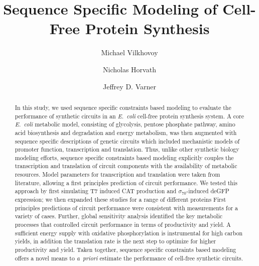 \documentclass[journal=asbcd6,manuscript=article]{achemso}
\author{Michael Vilkhovoy}
\author{Nicholas Horvath}
\author{Jeffrey D. Varner}
\affiliation[Cornell University]
{Robert Frederick Smith School of Chemical and Biomolecular Engineering, Cornell University, Ithaca, NY 14853}
\title{Sequence Specific Modeling of Cell-Free Protein Synthesis}
\begin{document}


\begin{abstract}
In this study, we used sequence specific constraints based modeling to evaluate the performance of synthetic circuits in an \emph{E.~coli} cell-free protein synthesis system.
A core \emph{E.~coli} metabolic model, consisting of glycolysis, pentose phosphate pathway, amino acid biosynthesis and degradation and energy metabolism, was then augmented with sequence specific descriptions of genetic circuits which included mechanistic models of promoter function, transcription and translation.
Thus, unlike other synthetic biology modeling efforts, sequence specific constraints based modeling explicitly couples the transcription and translation of circuit components with the availability of metabolic resources.
Model parameters for transcription and translation were taken from literature, allowing a first principles prediction of circuit performance.
We tested this approach by first simulating T7 induced CAT production and $\sigma_{70}$-induced deGFP expression; we then expanded these studies for a range of different proteins
First principles predictions of circuit performance were consistent with measurements for a variety of cases.
Further, global sensitivity analysis identified the key metabolic processes that controlled circuit performance in terms of productivity and yield.
A sufficient energy supply with oxidative phosphorylation is instrumental for high carbon yields, in addition the translation rate is the next step to optimize for higher productivity and yield.
Taken together, sequence specific constraints based modeling offers a novel means to \emph{a~priori} estimate the performance of cell-free synthetic circuits.
\end{abstract}

\end{document}
